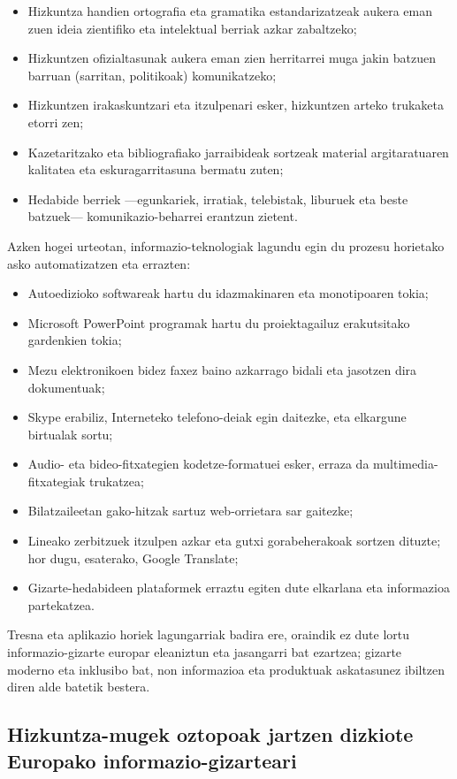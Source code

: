 \begin{multicols}{2}
\begin{itemize}
      \item Hizkuntza handien ortografia eta gramatika estandarizatzeak aukera eman zuen ideia zientifiko eta intelektual berriak azkar zabaltzeko;
      \item Hizkuntzen ofizialtasunak aukera eman zien herritarrei muga jakin batzuen barruan (sarritan, politikoak) komunikatzeko;
      \item Hizkuntzen irakaskuntzari eta itzulpenari esker, hizkuntzen arteko trukaketa etorri zen;
      \item Kazetaritzako eta bibliografiako jarraibideak sortzeak material argitaratuaren kalitatea eta eskuragarritasuna bermatu zuten;
      \item Hedabide berriek —egunkariek, irratiak, telebistak, liburuek eta beste batzuek— komunikazio-beharrei erantzun zietent.
\end{itemize}
Azken hogei urteotan, informazio-teknologiak lagundu egin du prozesu horietako asko automatizatzen eta errazten:
\begin{itemize}
      \item Autoedizioko softwareak hartu du idazmakinaren eta monotipoaren tokia;
      \item Microsoft PowerPoint programak hartu du proiektagailuz erakutsitako gardenkien tokia;
      \item Mezu elektronikoen bidez faxez baino azkarrago bidali eta jasotzen dira dokumentuak;
      \item Skype erabiliz, Interneteko telefono-deiak egin daitezke, eta elkargune birtualak sortu;
      \item Audio- eta bideo-fitxategien kodetze-formatuei esker, erraza da multimedia-fitxategiak trukatzea;
      \item Bilatzaileetan gako-hitzak sartuz web-orrietara sar gaitezke;
      \item Lineako zerbitzuek itzulpen azkar eta gutxi gorabeherakoak sortzen dituzte; hor dugu, esaterako, Google Translate;
      \item Gizarte-hedabideen plataformek erraztu egiten dute elkarlana eta informazioa partekatzea. 
\end{itemize}
   Tresna eta aplikazio horiek lagungarriak badira ere, oraindik ez dute lortu informazio-gizarte europar eleaniztun eta jasangarri bat ezartzea; gizarte moderno eta inklusibo bat, non informazioa eta produktuak askatasunez ibiltzen diren alde batetik bestera.

\subsection{Hizkuntza-mugek oztopoak jartzen dizkiote Europako informazio-gizarteari}
  

\end{multicols}
